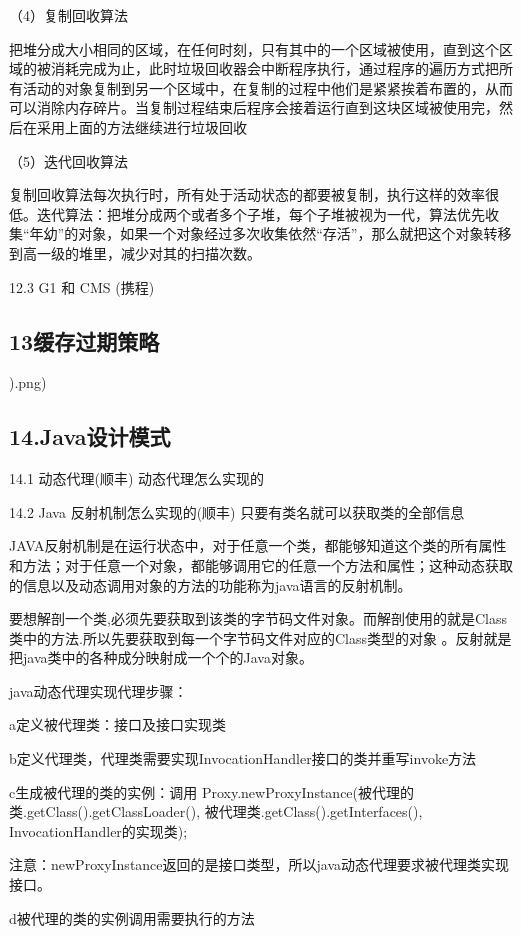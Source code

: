 \documentclass[UTF8]{ctexart}
\begin{document}
（4）复制回收算法

把堆分成大小相同的区域，在任何时刻，只有其中的一个区域被使用，直到这个区域的被消耗完成为止，此时垃圾回收器会中断程序执行，通过程序的遍历方式把所有活动的对象复制到另一个区域中，在复制的过程中他们是紧紧挨着布置的，从而可以消除内存碎片。当复制过程结束后程序会接着运行直到这块区域被使用完，然后在采用上面的方法继续进行垃圾回收

（5）迭代回收算法

复制回收算法每次执行时，所有处于活动状态的都要被复制，执行这样的效率很低。迭代算法：把堆分成两个或者多个子堆，每个子堆被视为一代，算法优先收集“年幼”的对象，如果一个对象经过多次收集依然“存活”，那么就把这个对象转移到高一级的堆里，减少对其的扫描次数。

12.3 G1 和 CMS (携程)

\subsection{13缓存过期策略}

).png)

\subsection{14.Java设计模式}

14.1 动态代理(顺丰)
动态代理怎么实现的

14.2 Java 反射机制怎么实现的(顺丰)
只要有类名就可以获取类的全部信息

JAVA反射机制是在运行状态中，对于任意一个类，都能够知道这个类的所有属性和方法；对于任意一个对象，都能够调用它的任意一个方法和属性；这种动态获取的信息以及动态调用对象的方法的功能称为java语言的反射机制。

要想解剖一个类,必须先要获取到该类的字节码文件对象。而解剖使用的就是Class类中的方法.所以先要获取到每一个字节码文件对应的Class类型的对象 。反射就是把java类中的各种成分映射成一个个的Java对象。

java动态代理实现代理步骤：

a定义被代理类：接口及接口实现类

b定义代理类，代理类需要实现InvocationHandler接口的类并重写invoke方法

c生成被代理的类的实例：调用 Proxy.newProxyInstance(被代理的类.getClass().getClassLoader(), 被代理类.getClass().getInterfaces(), InvocationHandler的实现类);

注意：newProxyInstance返回的是接口类型，所以java动态代理要求被代理类实现接口。

d被代理的类的实例调用需要执行的方法
\end{document}
